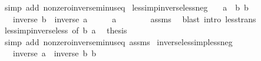 \begin{isabellebody}
\ {\isacharparenleft}{\kern0pt}simp\ add{\isacharcolon}{\kern0pt}\ nonzero{\isacharunderscore}{\kern0pt}inverse{\isacharunderscore}{\kern0pt}minus{\isacharunderscore}{\kern0pt}eq{\isacharparenright}{\kern0pt}\isanewline
{}\isamarkupfalse%
%
\endisatagproof
{\isafoldproof}%
%
\isadelimproof
\isanewline
%
\endisadelimproof
\isanewline
{}\isamarkupfalse%
\ less{\isacharunderscore}{\kern0pt}imp{\isacharunderscore}{\kern0pt}inverse{\isacharunderscore}{\kern0pt}less{\isacharunderscore}{\kern0pt}neg{\isacharcolon}{\kern0pt}\isanewline
\ \ \ {\isachardoublequoteopen}a\ {\isacharless}{\kern0pt}\ b{\isachardoublequoteclose}\ {\isachardoublequoteopen}b\ {\isacharless}{\kern0pt}\ {}{\isachardoublequoteclose}\isanewline
\ \ \ {\isachardoublequoteopen}inverse\ b\ {\isacharless}{\kern0pt}\ inverse\ a{\isachardoublequoteclose}\isanewline
%
\isadelimproof
%
\endisadelimproof
%
\isatagproof
{}\isamarkupfalse%
\ {\isacharminus}{\kern0pt}\isanewline
\ \ \isamarkupfalse%
\ {\isachardoublequoteopen}a\ {\isacharless}{\kern0pt}\ {}{\isachardoublequoteclose}\isanewline
\ \ \ \ \isamarkupfalse%
\ assms\ \isamarkupfalse%
\ {\isacharparenleft}{\kern0pt}blast\ intro{\isacharcolon}{\kern0pt}\ less{\isacharunderscore}{\kern0pt}trans{\isacharparenright}{\kern0pt}\isanewline
\ \ \isamarkupfalse%
\ less{\isacharunderscore}{\kern0pt}imp{\isacharunderscore}{\kern0pt}inverse{\isacharunderscore}{\kern0pt}less\ {\isacharbrackleft}{\kern0pt}of\ {\isachardoublequoteopen}{\isacharminus}{\kern0pt}b{\isachardoublequoteclose}\ {\isachardoublequoteopen}{\isacharminus}{\kern0pt}a{\isachardoublequoteclose}{\isacharbrackright}{\kern0pt}\ \isamarkupfalse%
\ {\isacharquery}{\kern0pt}thesis\isanewline
\ \ \ \ \isamarkupfalse%
\ {\isacharparenleft}{\kern0pt}simp\ add{\isacharcolon}{\kern0pt}\ nonzero{\isacharunderscore}{\kern0pt}inverse{\isacharunderscore}{\kern0pt}minus{\isacharunderscore}{\kern0pt}eq\ assms{\isacharparenright}{\kern0pt}\isanewline
{}\isamarkupfalse%
%
\endisatagproof
{\isafoldproof}%
%
\isadelimproof
\isanewline
%
\endisadelimproof
\isanewline
{}\isamarkupfalse%
\ inverse{\isacharunderscore}{\kern0pt}less{\isacharunderscore}{\kern0pt}imp{\isacharunderscore}{\kern0pt}less{\isacharunderscore}{\kern0pt}neg{\isacharcolon}{\kern0pt}\isanewline
\ \ \ {\isachardoublequoteopen}inverse\ a\ {\isacharless}{\kern0pt}\ inverse\ b{\isachardoublequoteclose}\ {\isachardoublequoteopen}b\ {\isacharless}{\kern0pt}\ {}{\isachardoublequoteclose}\isanewline

\end{isabellebody}
